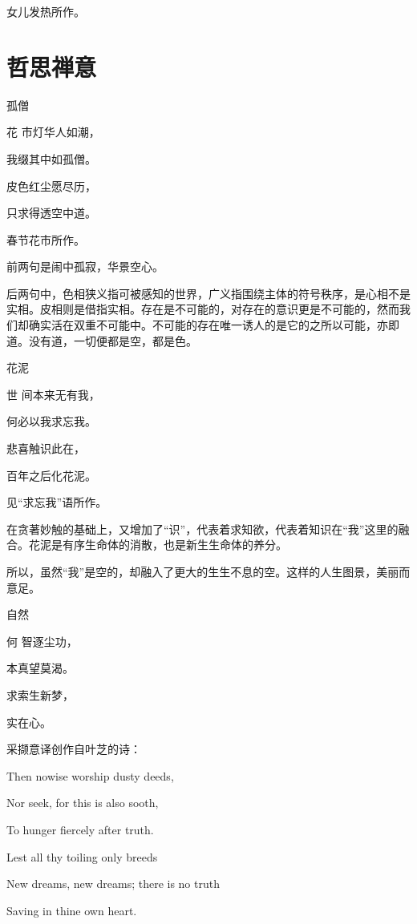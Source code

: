 \documentclass{article}
\newenvironment{poem}[3]{
\begin{minipage}{\textwidth}
\begin{pinyinscope}\begin{center}\Large\linespread{1.4}\selectfont #2\end{center}\end{pinyinscope}
\begin{pinyinscope}
	\begin{center}
	\Large\linespread{1.4}\rmfamily\selectfont #3
}{\end{center}
\end{pinyinscope}
\end{minipage}
}
\begin{document}
女儿发热所作。

\section{哲思禅意}

\begin{poem}{}{孤僧}
花市灯华人如潮，

我缀其中如孤僧。

皮色红尘愿尽历，

只求得透空中道。
\end{poem}

春节花市所作。

前两句是闹中孤寂，华景空心。

后两句中，色相狭义指可被感知的世界，广义指围绕主体的符号秩序，是心相不是实相。皮相则是借指实相。存在是不可能的，对存在的意识更是不可能的，然而我们却确实活在双重不可能中。不可能的存在唯一诱人的是它的之所以可能，亦即道。没有道，一切便都是空，都是色。

\begin{poem}{}{花泥}
世间本来无有我，

何必以我求忘我。

悲喜触识{}此在，

百年之后化花泥。
\end{poem}

见“求忘我”语所作。

在贪著妙触的基础上，又增加了“识”，代表着求知欲，代表着知识在“我”这里的融合。花泥是有序生命体的消散，也是新生生命体的养分。

所以，虽然“我”是空的，却融入了更大的生生不息的空。这样的人生图景，美丽而意足。

\begin{poem}{}{自然}
何智逐尘功，

本真望莫渴。

求索生新梦，

实{}在心{}。
\end{poem}

采撷意译创作自叶芝的诗：

\begin{displayquote}
Then nowise worship dusty deeds,

Nor seek, for this is also sooth,

To hunger fiercely after truth.

Lest all thy toiling only breeds

New dreams, new dreams; there is no truth

Saving in thine own heart.
\end{displayquote}
\end{document}

